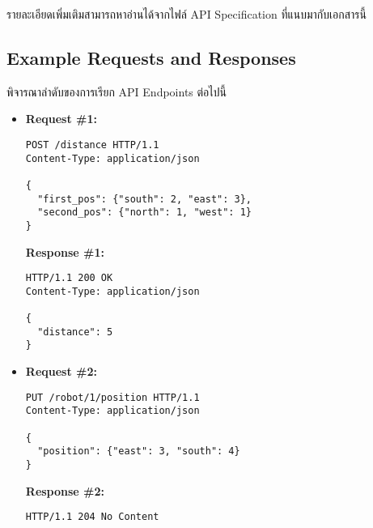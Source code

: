 \noindent
รายละเอียดเพิ่มเติมสามารถหาอ่านได้จากไฟล์ API Specification ที่แนบมากับเอกสารนี้

\subsection{Example Requests and Responses}

\noindent
พิจารณาลำดับของการเรียก API Endpoints ต่อไปนี้

\begin{itemize}
\item  %
\textbf{Request \#1:}
\begin{lstlisting}[xleftmargin=1pc,numbers=none]
POST /distance HTTP/1.1
Content-Type: application/json

{
  "first_pos": {"south": 2, "east": 3},
  "second_pos": {"north": 1, "west": 1}
}
\end{lstlisting}
\newpage
\textbf{Response \#1:}
\begin{lstlisting}[xleftmargin=1pc,numbers=none]
HTTP/1.1 200 OK
Content-Type: application/json

{
  "distance": 5
}
\end{lstlisting}

\item  %
\textbf{Request \#2:}
\begin{lstlisting}[xleftmargin=1pc,numbers=none]
PUT /robot/1/position HTTP/1.1
Content-Type: application/json

{
  "position": {"east": 3, "south": 4}
}
\end{lstlisting}
\textbf{Response \#2:}
\begin{lstlisting}[xleftmargin=1pc,numbers=none]
HTTP/1.1 204 No Content
\end{lstlisting}

\end{itemize}

